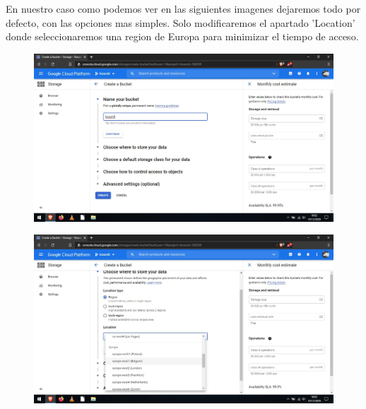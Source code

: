 \documentclass[a4paper,10pt]{article}
\begin{document}
En nuestro caso como podemos ver en las siguientes imagenes dejaremos todo por defecto, con las opciones mas simples. Solo modificaremos el apartado 'Location' donde seleccionaremos una region de Europa para minimizar el tiempo de acceso.

\begin{figure}[H]
\begin{center}
\includegraphics[width=500pt]{./fotos/GoogleCloud/11 - GC.jpg}
\end{center}
\end{figure}

\begin{figure}[H]
\begin{center}
\includegraphics[width=500pt]{./fotos/GoogleCloud/12 - GC.jpg}
\end{center}
\end{figure}
\end{document}
